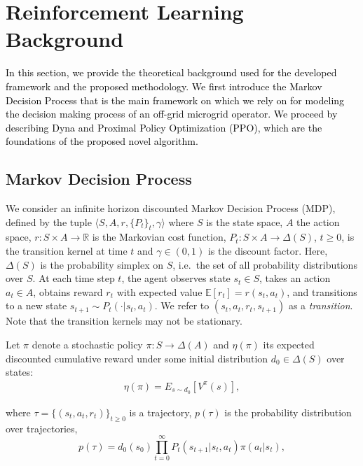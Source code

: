 \documentclass{article}
\begin{document}
\section{Reinforcement Learning Background} \label{sec: RLBackground}
    \textcolor{black}{In this section, we provide the theoretical background used for the developed framework and the proposed methodology. We first introduce the Markov Decision Process that is the main framework on which we rely on for modeling the decision making process of an off-grid microgrid operator. We proceed by describing Dyna and Proximal Policy Optimization (PPO), which are the foundations of the proposed novel algorithm.}
    
\subsection{ Markov Decision Process}

    We consider an infinite horizon discounted Markov Decision Process (MDP), defined by the tuple $\langle S,A,r,\{P_t\}_t,\gamma \rangle$ where  $S$ is the state space, $A$ the action space, $r:S \times A \rightarrow \mathbb{R}$ is the Markovian cost function, $P_t: S \times A \rightarrow \Delta(S) $, $t\geq 0$, is the transition kernel at time $t$ and $\gamma \in (0, 1) $ is the discount factor. Here, $\Delta(S)$ is the probability simplex on $S$, i.e.~the set of all probability distributions over $S$. At each time step $t$, the agent observes state $s_t \in S$, takes an action $a_t \in A$, obtains reward $r_t$ with expected value $\mathbb{E}[r_t] = r(s_t, a_t)$, and transitions to a new state $s_{t+1} \sim P_t(\cdot \rvert s_t, a_t)$. We refer to $(s_t,a_t,r_t,s_{t+1})$ as a {\em transition}. Note that the transition kernels may not be stationary.
   
    Let $\pi$ denote a stochastic policy $\pi : S \rightarrow \Delta(A)$ and $\eta(\pi)$ its expected discounted cumulative reward under some initial distribution $d_0\in\Delta(S)$ over states: %
    \begin{gather}
    \eta(\pi) = E_{s\sim d_0} [V^{\pi}(s)],\label{eqn: expected_cumulative_reward}
    \end{gather}
    
	\noindent
     where $\tau = \{(s_t,a_t, r_t)\}_{t \geq 0}$ is a trajectory, $p(\tau)$ is the probability distribution over trajectories,  %
     \begin{equation}
        p(\tau) = d_0(s_0) \prod_{t=0}^\infty P_t(s_{t+1} \rvert s_t, a_t) \pi(a_t \rvert s_t),
     \end{equation}{}
     
\end{document}
